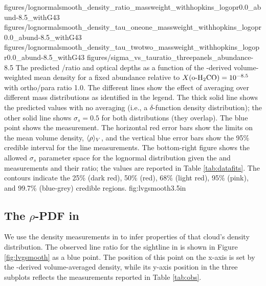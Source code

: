 \FigureFourPDF
    {figures/lognormalsmooth_density_ratio_massweight_withhopkins_logopr0.0_abund-8.5_withG43}
    {figures/lognormalsmooth_density_tau_oneone_massweight_withhopkins_logopr0.0_abund-8.5_withG43}
    {figures/lognormalsmooth_density_tau_twotwo_massweight_withhopkins_logopr0.0_abund-8.5_withG43}
    {figures/sigma_vs_tauratio_threepanels_abundance-8.5}
{The predicted \formaldehyde \oneone/\twotwo ratio and optical depths as a
function of the \thirteenco-derived volume-weighted mean density for a fixed
abundance relative to \hh $X(\textrm{o-H}_2\textrm{CO}) = 10^{-8.5}$  with \hh ortho/para ratio
1.0.  The different lines show the effect of averaging over different
mass distributions as identified in the legend. %
The thick solid line shows the predicted values
with no averaging (i.e., a $\delta$-function density distribution); the other solid line
shows $\sigma_s=0.5$ for both distributions (they overlap).
The blue point shows the \north measurement.  The horizontal red error bars
show the limits on the mean volume density, $\langle\rho\rangle_V$, and the vertical blue error
bars show the 95\% credible interval for the \formaldehyde line measurements.
The bottom-right figure shows the allowed $\sigma_s$ parameter space for the
lognormal distribution given the \oneone and \twotwo measurements and their
ratio; the values are reported in Table \ref{tab:datafits}.  The contours
indicate the 25\% (dark red), 50\% (red), 68\% (light red), 95\% (pink), and 99.7\%
(blue-grey) credible regions.
}
{fig:lvgsmooth}{3.5in}

\subsection{The $\rho$-PDF in \GRSMC}
\label{sec:grsmcturb}
We use the density measurements in \GRSMC to infer properties of that
cloud's density distribution.  The observed line ratio for the \north sightline in
\GRSMC is shown in Figure \ref{fig:lvgsmooth} as a blue point.  The position
of this point on the x-axis is set by the \thirteenco-derived volume-averaged density,
while its y-axis position in the three subplots reflects the \formaldehyde measurements
reported in Table \ref{tab:obs}.

